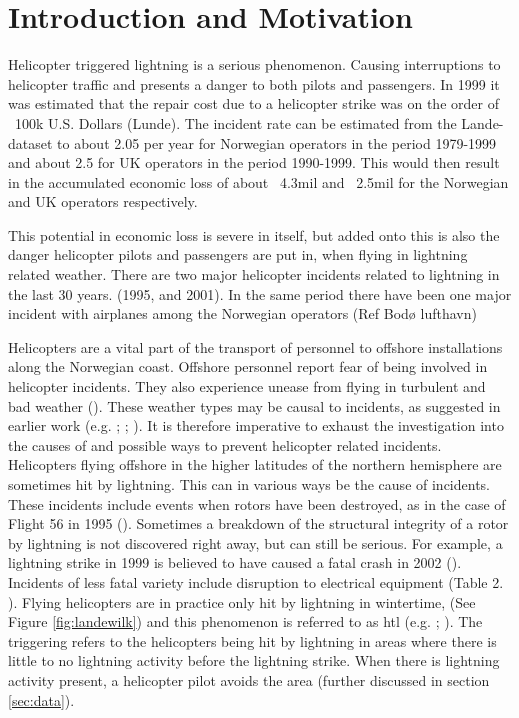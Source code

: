 \chapter{Introduction and Motivation}\label{ch:introduction}


Helicopter triggered lightning is a serious phenomenon. Causing interruptions to helicopter traffic and presents a danger to both pilots and passengers. In 1999 it was estimated that the repair cost due to a helicopter strike was on the order of  ~100k U.S. Dollars (Lunde). The incident rate can be estimated from the Lande-dataset to about 2.05 per year for Norwegian operators in the period 1979-1999 and about 2.5 for UK operators in the period 1990-1999. This would then result in the accumulated economic loss of about ~4.3mil and ~2.5mil for the Norwegian and UK operators respectively.

This potential in economic loss is severe in itself, but added onto this is also the danger helicopter pilots and passengers are put in, when flying in lightning related weather. There are two major helicopter incidents related to lightning in the last 30 years. (1995, and 2001). In the same period there have been one major incident with airplanes among the Norwegian operators (Ref Bodø lufthavn)

Helicopters are a vital part of the transport of personnel to offshore installations along the Norwegian coast. Offshore personnel report fear of being involved in helicopter incidents. They also experience unease from flying in turbulent and bad weather (\cite{wasilewska2019}). These weather types may be causal to incidents, as suggested in earlier work (e.g. \cite{lande1999}; \cite{wilkinson2013}; \cite{smart1997}). It is therefore imperative to exhaust the investigation into the causes of and possible ways to prevent helicopter related incidents. 
Helicopters flying offshore in the higher latitudes of the northern hemisphere are sometimes hit by lightning. This can in various ways be the cause of incidents. These incidents include events when rotors have been destroyed, as in the case of Flight 56 in 1995 (\cite{smart1997}). Sometimes a breakdown of the structural integrity of a rotor by lightning is not discovered right away, but can still be serious. For example, a lightning strike in 1999 is believed to have caused a fatal crash in 2002 (\cite{smart2005}). Incidents of less fatal variety include disruption to electrical equipment (Table 2. \cite{uman2003}). Flying helicopters are in practice only hit by lightning in wintertime, (See Figure \ref{fig:landewilk}) and this phenomenon is referred to as \acrfull{htl} (e.g. \cite{lande1999}; \cite{wilkinson2013}). The triggering refers to the helicopters being hit by lightning in areas where there is little to no lightning activity before the lightning strike. When there is lightning activity present, a helicopter pilot avoids the area (further discussed in section \ref{sec:data}).


